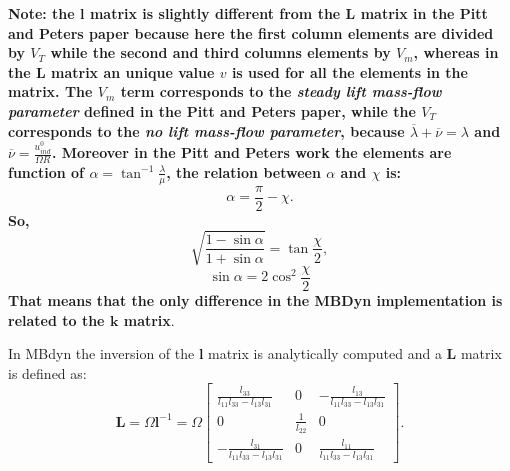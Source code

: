 \textbf{Note: the $\mathbf{l}$ matrix is slightly different from the $\mathbf{L}$
matrix in the Pitt and Peters paper \cite{PITT} because here the
first column elements are divided by $V_T$ while the second and
third columns elements by $V_m$, whereas in the $\mathbf{L}$ matrix
an unique value $v$ is used for all the elements in the matrix.
The $V_m$ term corresponds to the \emph{steady lift mass-flow parameter}
defined in the Pitt and Peters paper, while the $V_T$ corresponds to
the \emph{no lift mass-flow parameter}, because 
$\overline{\lambda} + \overline{\nu} = \lambda$ and 
$\overline{\nu} = \frac{u_{ind}^{0}}{\Omega R}$.
Moreover in the Pitt and Peters work the elements are function of
$\alpha = \tan^{-1}{\frac{\lambda}{\mu}}$, the relation between $\alpha$ and
$\chi$ is:
\begin{equation}
\alpha = \frac{\pi}{2} - \chi.
\end{equation}
So,
\begin{equation}
\sqrt{\frac{1-\sin{\alpha}}{1+\sin{\alpha}}} = \tan{\frac{\chi}{2}},
\end{equation}
\begin{equation}
\sin{\alpha} = 2 \cos^{2} {\frac{\chi}{2}}
\end{equation}
That means that the only difference in the MBDyn implementation is
related to the $\mathbf{k}$ matrix}.

In MBdyn the inversion of the $\mathbf{l}$ matrix is analytically computed
and a $\mathbf{L}$ matrix is defined as:
\begin{equation}
\mathbf{L} = \Omega \mathbf{l}^{-1} = \Omega \left[
\begin{array}{ccc}
\frac{l_{33}}{l_{11}l_{33}-l_{13}l_{31}} & 0 & -\frac{l_{13}}{l_{11}l_{33}-l_{13}l_{31}} \\
0 & \frac{1}{l_{22}} & 0 \\
-\frac{l_{31}}{l_{11}l_{33}-l_{13}l_{31}} & 0 & \frac{l_{11}}{l_{11}l_{33}-l_{13}l_{31}}
\end{array}
\right].
\end{equation}

%

